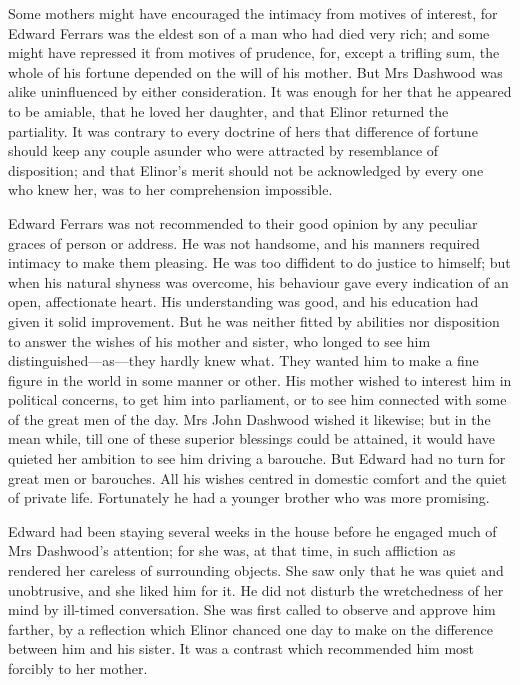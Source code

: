 Some mothers might have encouraged the intimacy from motives of interest, for Edward Ferrars was the eldest son of a man who had died very rich; and some might have repressed it from motives of prudence, for, except a trifling sum, the whole of his fortune depended on the will of his mother. But Mrs Dashwood was alike uninfluenced by either consideration. It was enough for her that he appeared to be amiable, that he loved her daughter, and that Elinor returned the partiality. It was contrary to every doctrine of hers that difference of fortune should keep any couple asunder who were attracted by resemblance of disposition; and that Elinor’s merit should not be acknowledged by every one who knew her, was to her comprehension impossible.

Edward Ferrars was not recommended to their good opinion by any peculiar graces of person or address. He was not handsome, and his manners required intimacy to make them pleasing. He was too diffident to do justice to himself; but when his natural shyness was overcome, his behaviour gave every indication of an open, affectionate heart. His understanding was good, and his education had given it solid improvement. But he was neither fitted by abilities nor disposition to answer the wishes of his mother and sister, who longed to see him distinguished—as—they hardly knew what. They wanted him to make a fine figure in the world in some manner or other. His mother wished to interest him in political concerns, to get him into parliament, or to see him connected with some of the great men of the day. Mrs John Dashwood wished it likewise; but in the mean while, till one of these superior blessings could be attained, it would have quieted her ambition to see him driving a barouche. But Edward had no turn for great men or barouches. All his wishes centred in domestic comfort and the quiet of private life. Fortunately he had a younger brother who was more promising.

Edward had been staying several weeks in the house before he engaged much of Mrs Dashwood’s attention; for she was, at that time, in such affliction as rendered her careless of surrounding objects. She saw only that he was quiet and unobtrusive, and she liked him for it. He did not disturb the wretchedness of her mind by ill-timed conversation. She was first called to observe and approve him farther, by a reflection which Elinor chanced one day to make on the difference between him and his sister. It was a contrast which recommended him most forcibly to her mother.

